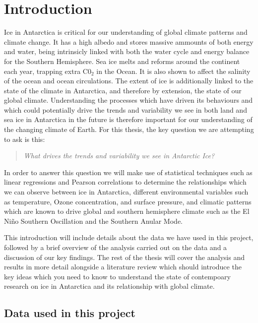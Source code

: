 \documentclass[../main.tex]{subfiles}
\begin{document}
\chapter{Introduction}

Ice in Antarctica is critical for our understanding of global climate patterns and climate change. It has a high albedo and stores massive ammounts of both energy and water, being intrinsicly linked with both the water cycle and energy balance for the Southern Hemisphere. Sea ice melts and reforms around the continent each year, trapping extra C0$_2$ in the Ocean. It is also shown to affect the salinity of the ocean and ocean circulations. 
The extent of ice is additionally linked to the state of the climate in Antarctica, and therefore by extension, the state of our global climate. Understanding the processes which have driven its behaviours and which could potentially drive the trends and variability we see in both land and sea ice in Antarctica in the future is therefore important for our understanding of the changing climate of Earth.
For this thesis, the key question we are attempting to ask is this:

\begin{quote}
	\textit{What drives the trends and variability we see in Antarctic Ice?}
\end{quote}

In order to answer this question we will make use of statistical techniques such as linear regressions and Pearson correlations to determine the relationships which we can observe between ice in Antarctica, different environmental variables such as temperature, Ozone concentration, and surface pressure, and climatic patterns which are known to drive global and southern hemisphere climate such as the El Ni\~no Southern Oscillation and the Southern Anular Mode.

This introduction will include details about the data we have used in this project, followed by a brief overview of the analysis carried out on the data and a discussion of our key findings. The rest of the thesis will cover the analysis and results in more detail alongside a literature review which should introduce the key ideas which you need to know to understand the state of contempoary research on ice in Antarctica and its relationship with global climate.


\pagebreak
\section{Data used in this project}
\end{document}
